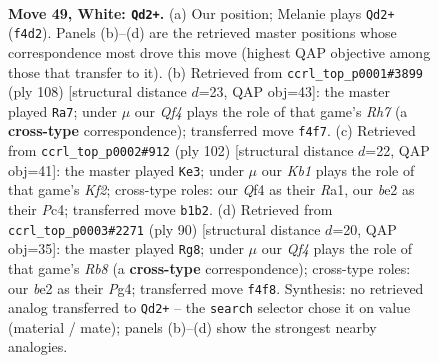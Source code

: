 \documentclass[11pt]{article}
\begin{document}
\clearpage

\begin{figure}[p]\centering
\begin{subfigure}{0.46\textwidth}\centering
\resizebox{\linewidth}{!}{%
\newchessgame
\chessboard[
  setfen={8/1p1k4/8/8/r3PQ2/8/4b1PP/1K6 w - - 0 49},
  showmover=false,
  pgfstyle=straightmove, color=movearrow, markmove={f4-d2}
]}
\caption{}
\end{subfigure}\hfill
\begin{subfigure}{0.46\textwidth}\centering
\resizebox{\linewidth}{!}{%
\newchessgame
\chessboard[
  setfen={8/7R/3k4/6KP/b7/8/5P2/7r w - - 4 55},
  showmover=false,
  pgfstyle=straightmove, color=movearrow, markmove={h7-a7}
]}
\caption{}
\end{subfigure}
\\[4pt]
\begin{subfigure}{0.46\textwidth}\centering
\resizebox{\linewidth}{!}{%
\newchessgame
\chessboard[
  setfen={r7/8/8/5k1p/P1P5/8/5K2/R7 w - - 9 52},
  showmover=false,
  pgfstyle=straightmove, color=movearrow, markmove={f2-e3}
]}
\caption{}
\end{subfigure}\hfill
\begin{subfigure}{0.46\textwidth}\centering
\resizebox{\linewidth}{!}{%
\newchessgame
\chessboard[
  setfen={1R6/5p2/1P6/4k1p1/6P1/1r6/5K2/8 w - - 2 46},
  showmover=false,
  pgfstyle=straightmove, color=movearrow, markmove={b8-g8}
]}
\caption{}
\end{subfigure}
\caption{\textbf{Move 49, White: \texttt{Qd2+}.} (a) Our position; Melanie plays \texttt{Qd2+} (\texttt{f4d2}). Panels (b)--(d) are the retrieved master positions whose correspondence most drove this move (highest QAP objective among those that transfer to it). (b) Retrieved from \texttt{ccrl\_top\_p0001\#3899} (ply 108) [structural distance $d$=23, QAP obj=43]: the master played \texttt{Ra7}; under $\mu$ our \emph{Qf4} plays the role of that game's \emph{Rh7} (a \textbf{cross-type} correspondence); transferred move \texttt{f4f7}. (c) Retrieved from \texttt{ccrl\_top\_p0002\#912} (ply 102) [structural distance $d$=22, QAP obj=41]: the master played \texttt{Ke3}; under $\mu$ our \emph{Kb1} plays the role of that game's \emph{Kf2}; cross-type roles: our \emph{Q}f4 as their \emph{R}a1, our \emph{b}e2 as their \emph{P}c4; transferred move \texttt{b1b2}. (d) Retrieved from \texttt{ccrl\_top\_p0003\#2271} (ply 90) [structural distance $d$=20, QAP obj=35]: the master played \texttt{Rg8}; under $\mu$ our \emph{Qf4} plays the role of that game's \emph{Rb8} (a \textbf{cross-type} correspondence); cross-type roles: our \emph{b}e2 as their \emph{P}g4; transferred move \texttt{f4f8}. Synthesis: no retrieved analog transferred to \texttt{Qd2+} -- the \texttt{search} selector chose it on value (material / mate); panels (b)--(d) show the strongest nearby analogies.}
\label{fig:thought-m96}
\end{figure}
\end{document}
